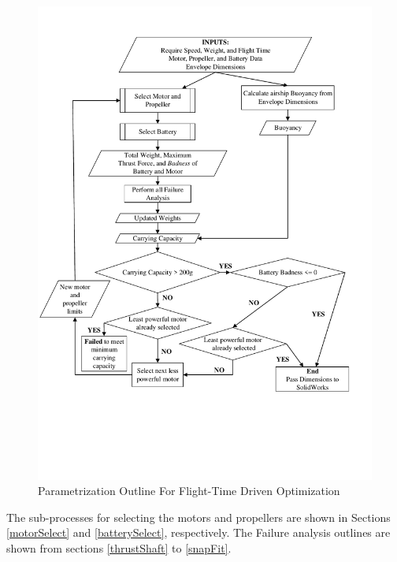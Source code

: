 \documentclass[../main.tex]{subfiles}
\begin{document}
\begin{figure}[H]
	\centering
	\includegraphics[width=\linewidth]{img/paramaterization/timeBased.pdf}
	\caption{Parametrization Outline For Flight-Time Driven Optimization}
	\label{fig:timeDriven}
\end{figure}

The sub-processes for selecting the motors and propellers are shown in Sections \ref{motorSelect} and \ref{batterySelect}, respectively. The Failure analysis outlines are shown from sections \ref{thrustShaft} to \ref{snapFit}.
\end{document}
